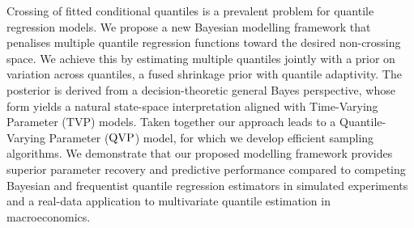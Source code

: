 Crossing of fitted conditional quantiles is a prevalent problem for quantile regression models. We propose a new  Bayesian modelling framework that penalises multiple quantile regression functions toward the desired non-crossing space. We achieve this by estimating multiple quantiles jointly with a prior on variation across quantiles, a fused shrinkage prior with quantile adaptivity. The posterior is derived from a decision-theoretic general Bayes perspective, whose form yields a natural state-space interpretation aligned with Time-Varying Parameter ($\mathrm{TVP}$) models. Taken together our approach leads to a Quantile-Varying Parameter ($\operatorname{QVP}$) model, for which we develop efficient sampling algorithms. 
We demonstrate that our proposed modelling framework provides superior parameter recovery and predictive performance compared to competing Bayesian and frequentist quantile regression estimators in simulated experiments and a real-data application to multivariate quantile estimation in macroeconomics.




